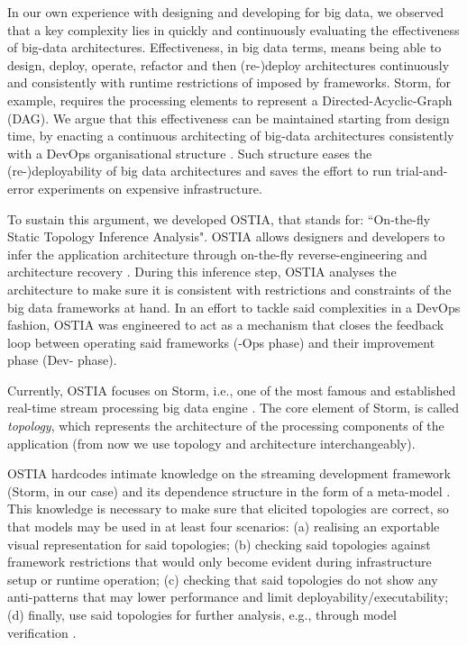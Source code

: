 In our own experience with designing and developing for big data, we observed that a key complexity lies in quickly and continuously evaluating the effectiveness of big-data architectures. Effectiveness, in big data terms, means being able to design, deploy, operate, refactor and then (re-)deploy architectures continuously and consistently with runtime restrictions of imposed by frameworks. Storm, for example, requires the processing elements to represent a Directed-Acyclic-Graph (DAG).
We argue that this effectiveness can be maintained starting from design time, by enacting a continuous architecting of big-data architectures consistently with a DevOps organisational structure \cite{ossslr,devops}. Such structure eases the (re-)deployability of big data architectures and saves the effort to run trial-and-error experiments on expensive infrastructure.

To sustain this argument, we developed OSTIA, that stands for: ``On-the-fly Static Topology Inference Analysis". OSTIA allows designers and developers to infer the application architecture through on-the-fly reverse-engineering and architecture recovery \cite{archrec}. During this inference step, OSTIA analyses the architecture to make sure it is consistent with restrictions and constraints of the big data frameworks at hand. In an effort to tackle said complexities in a DevOps fashion, OSTIA was engineered to act as a mechanism that closes the feedback loop between operating said frameworks (-Ops phase) and their improvement phase (Dev- phase).

Currently, OSTIA focuses on Storm, i.e., one of the most famous and established real-time stream processing big data engine \cite{storm, toshniwal2014storm}. The core element of Storm, is called \emph{topology}, which represents the architecture of the processing components of the application (from now we use topology and architecture interchangeably).

OSTIA hardcodes intimate knowledge on the streaming development framework (Storm, in our case) and its dependence structure in the form of a meta-model \cite{mda}. This knowledge is necessary to make sure that elicited topologies are correct, so that models may be used in at least four scenarios: (a) realising an exportable visual representation for said topologies; (b) checking said topologies against framework restrictions that would only become evident during infrastructure setup or runtime operation; (c) checking that said topologies do not show any anti-patterns \cite{patternoriented2000} that may lower performance and limit deployability/executability; (d) finally, use said topologies for further analysis, e.g., through model verification \cite{icsoft}.

